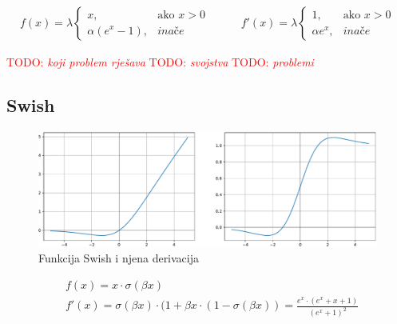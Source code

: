 \documentclass[times, utf8, numeric, diplomski]{fer}
\def\otherwise{\textit{inače}}
\def\TODO#1{\noindent\textcolor{red}{TODO: \textit{#1}}\newline}
\def\todo#1{\TODO{#1}}
\def\todoimg#1{\begin{center} \textcolor{red}{\big[ IMAGE: \textit{#1} \big]} \end{center}}
\begin{document}
\begin{equation}
\label{eq:selu}
\begin{split}
f(x) = \lambda
\begin{cases}
x,					& \text{ako } x > 0 \\
\alpha (e^x - 1),	& \otherwise
\end{cases}
\end{split}
\qquad
\begin{split}
f'(x) = \lambda
\begin{cases}
1,	 		& \text{ako } x > 0 \\
\alpha e^x,	& \otherwise
\end{cases}
\end{split}
\end{equation}

\todo{koji problem rješava}
\todo{svojstva}
\todo{problemi}

%

\subsection{Swish}
\label{func:swish}

\begin{figure}[H]
\includegraphics[width=\textwidth]{Swish.pdf}
\centering
\caption{Funkcija Swish i njena derivacija}
\label{fig:swish}
\end{figure}

\begin{equation}
\label{eq:swish}
\begin{split}
&f(x) = x \cdot \sigma(\beta x)
\\
&f'(x) = \sigma(\beta x) \cdot (1 + \beta x \cdot (1-\sigma(\beta x)) = \frac{e^x \cdot (e^x + x + 1)}{(e^x + 1)^2}
\end{split}
\end{equation}
\end{document}
